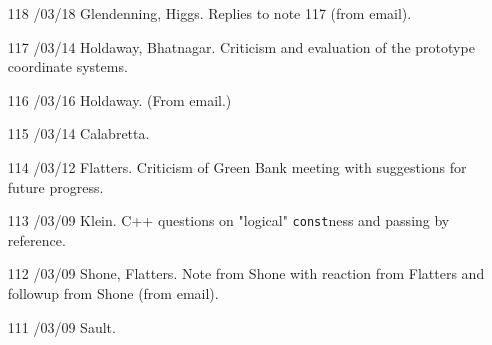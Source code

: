 \begin{enumerate}
\item[118]
/03/18 Glendenning, Higgs.
\linebreak  Replies to note 117 (from email).

\item[117]
/03/14 Holdaway, Bhatnagar.
\linebreak  Criticism and evaluation of the prototype coordinate systems.

\item[116]
/03/16 Holdaway.
\linebreak  (From email.)

\item[115]
/03/14 Calabretta.

\item[114]
/03/12 Flatters.
\linebreak  Criticism of Green Bank meeting with suggestions for future progress.

\item[113]
/03/09 Klein.
\linebreak  C++ questions on "logical" \texttt{const}ness and passing by reference.

\item[112]
/03/09 Shone, Flatters.
\linebreak  Note from Shone with reaction from Flatters and followup from Shone
   (from email).

\item[111]
/03/09 Sault.


\end{enumerate}
